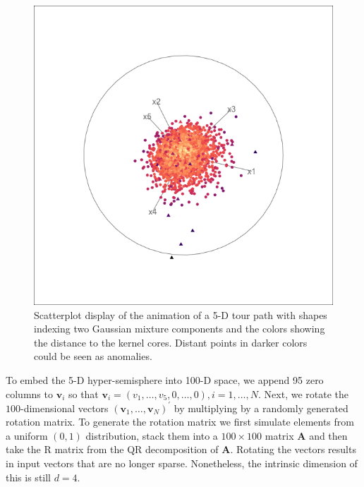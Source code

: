 \documentclass[12pt]{article}
\begin{document}
\begin{figure}

{\centering \includegraphics[width=0.7\linewidth]{figures/tourr_5d_semisphere} 

}

\caption{Scatterplot display of the animation of a 5-D tour path with shapes indexing two Gaussian mixture components and the colors showing the distance to the kernel cores. Distant points in darker colors could be seen as anomalies.}\label{fig:fivedmeta}
\end{figure}

To embed the 5-D hyper-semisphere into 100-D space, we append 95 zero columns to \(\bm{v}_i\) so that \(\bm{v}_i=(v_1, \dots, v_5, 0, \dots, 0), i=1,\dots,N\). Next, we rotate the \(100\)-dimensional vectors \((\bm{v}_1, \dots, \bm{v}_N)^\prime\) by multiplying by a randomly generated rotation matrix. To generate the rotation matrix we first simulate elements from a uniform \((0,1)\) distribution, stack them into a \(100\times 100\) matrix \(\bm{A}\) and then take the R matrix from the QR decomposition of \(\bm{A}\). Rotating the vectors results in input vectors that are no longer sparse. Nonetheless, the intrinsic dimension of this is still \(d=4\).
\end{document}
